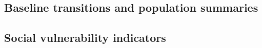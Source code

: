 \subsection{Baseline transitions and population summaries}
\label{sec:methods-transitions}


\subsection{Social vulnerability indicators}
\label{sec:svi}
\label{sec:methods-svi}

